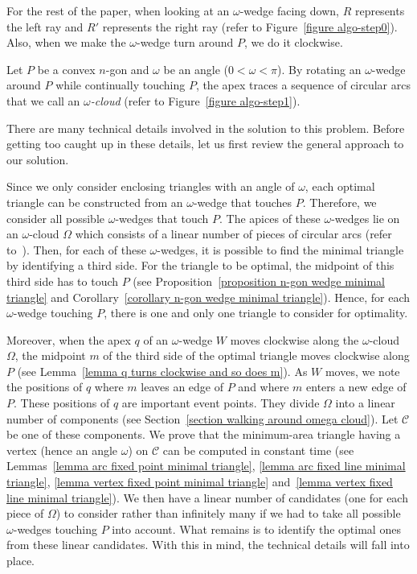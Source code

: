 \documentclass[11pt, oneside]{article}
\begin{document}
For the rest of the paper,
when looking at an $\omega$-wedge facing down,
$R$ represents the left ray and $R'$ represents the right ray
(refer to Figure~\ref{figure algo-step0}).
Also,
when we make the $\omega$-wedge turn around $P$,
we do it clockwise.

\begin{definition}
Let $P$ be a convex $n$-gon
and $\omega$ be an angle 
($0<\omega<\pi$).
By rotating an $\omega$-wedge around $P$
while continually touching $P$,
the apex traces a sequence of circular arcs
that we call an \emph{$\omega$-cloud}
(refer to Figure~\ref{figure algo-step1}).
\end{definition}

There are many technical details involved 
in the solution to this problem.
Before getting too caught up in these details,
let us first review the general approach to our solution.

Since we only consider enclosing triangles 
with an angle of $\omega$, 
each optimal triangle can be constructed 
from an $\omega$-wedge that touches $P$.
Therefore, 
we consider all possible $\omega$-wedges that touch $P$.
The apices of these $\omega$-wedges
lie on an $\omega$-cloud $\Omega$ which consists 
of a linear number of pieces of circular arcs 
(refer to~\cite{DBLP:journals/ijcga/BoseMSS11}).
Then, 
for each of these $\omega$-wedges,
it is possible to find the minimal triangle
by identifying a third side.
For the triangle to be optimal,
the midpoint of this third side
has to touch $P$
(see Proposition~\ref{proposition n-gon wedge minimal triangle} 
and Corollary~\ref{corollary n-gon wedge minimal triangle}).
Hence,
for each $\omega$-wedge touching $P$,
there is one and only one triangle to consider for optimality.

Moreover,
when the apex $q$ of an $\omega$-wedge $W$
moves clockwise along the $\omega$-cloud $\Omega$,
the midpoint $m$ of the third side of the optimal triangle
moves clockwise along $P$
(see Lemma~\ref{lemma q turns clockwise and so does m}).
As $W$ moves,
we note the positions of $q$
where $m$ leaves an edge of $P$
and where $m$ enters a new edge of $P$.
These positions of $q$ are important event points.
They divide $\Omega$ into a linear number of components
(see Section~\ref{section walking around omega cloud}).
Let $\mathcal{C}$ be one of these components.
We prove that the minimum-area triangle having a vertex 
(hence an angle $\omega$) on $\mathcal{C}$
can be computed in constant time
(see Lemmas~\ref{lemma arc fixed point minimal triangle},
\ref{lemma arc fixed line minimal triangle},
\ref{lemma vertex fixed point minimal triangle}
and~\ref{lemma vertex fixed line minimal triangle}).
We then have a linear number of candidates
(one for each piece of $\Omega$)
to consider rather than infinitely many
if we had to take all possible 
$\omega$-wedges touching $P$ into account.
What remains is to identify
the optimal ones
from these linear candidates.
With this in mind,
the technical details will fall into place.
\end{document}
